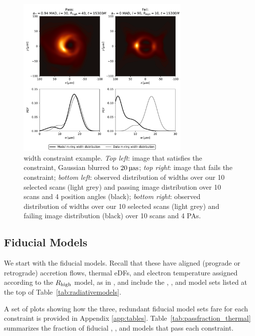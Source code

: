 \begin{figure}
  \centering
  \includegraphics[width=0.75\textwidth]{figures/mring_width_example.pdf}
  \caption{\Mring width constraint example.
    \emph{Top left}: image that satisfies the constraint, Gaussian blurred to $20\uas$;
    \emph{top right}: image that fails the constraint;
    \emph{bottom left}: observed distribution of \mring widths over our 10 selected scans (light grey) and passing image distribution over 10 scans and 4 position angles (black);
    \emph{bottom right}: observed distribution of \mring widths over our 10 selected scans (light grey) and failing image distribution (black) over 10 scans and 4 PAs.}
  \label{fig:mring_width_example}
\end{figure}

\subsection{Fiducial Models}\label{subsec:thermal}

We start with the fiducial models.
Recall that these have aligned (prograde or retrograde) accretion flows, thermal eDFs, and electron temperature assigned according to the $R_\mathrm{high}$ model, as in , and include the  \kharma, \bhac, and \hamr model sets listed at the top of Table~\ref{tab:radiativemodels}.

A set of plots showing how the three, redundant fiducial model sets fare for each constraint is provided in Appendix \ref{app:tables}.
Table~\ref{tab:passfraction_thermal} summarizes the fraction of fiducial \kharma, \bhac, and \hamr models that pass each constraint.

